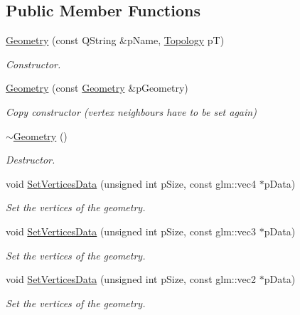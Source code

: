 \subsection*{Public Member Functions}
\begin{DoxyCompactItemize}
\item 
\hyperlink{class_geometry_ae8f25281b573912b941d26a75ef5ce7b}{Geometry} (const Q\+String \&p\+Name, \hyperlink{class_geometry_af0136a3b268286ee5921cc6af5239293}{Topology} p\+T)
\begin{DoxyCompactList}\small\item\em Constructor. \end{DoxyCompactList}\item 
\hyperlink{class_geometry_add6d514eb5cc4e379432d92c6ae6c257}{Geometry} (const \hyperlink{class_geometry}{Geometry} \&p\+Geometry)
\begin{DoxyCompactList}\small\item\em Copy constructor (vertex neighbours have to be set again) \end{DoxyCompactList}\item 
\hyperlink{class_geometry_ad55e832122ab3a2833dcaa6507867678}{$\sim$\+Geometry} ()
\begin{DoxyCompactList}\small\item\em Destructor. \end{DoxyCompactList}\item 
void \hyperlink{class_geometry_a912818f30f8776abf60196f48b1a3415}{Set\+Vertices\+Data} (unsigned int p\+Size, const glm\+::vec4 $\ast$p\+Data)
\begin{DoxyCompactList}\small\item\em Set the vertices of the geometry. \end{DoxyCompactList}\item 
void \hyperlink{class_geometry_ae957bc46a1755764e31e58f22f0304a9}{Set\+Vertices\+Data} (unsigned int p\+Size, const glm\+::vec3 $\ast$p\+Data)
\begin{DoxyCompactList}\small\item\em Set the vertices of the geometry. \end{DoxyCompactList}\item 
void \hyperlink{class_geometry_add72fbd9292d479bb564d0b2521da7f9}{Set\+Vertices\+Data} (unsigned int p\+Size, const glm\+::vec2 $\ast$p\+Data)
\begin{DoxyCompactList}\small\item\em Set the vertices of the geometry. \end{DoxyCompactList}\item 

\end{DoxyCompactItemize}
